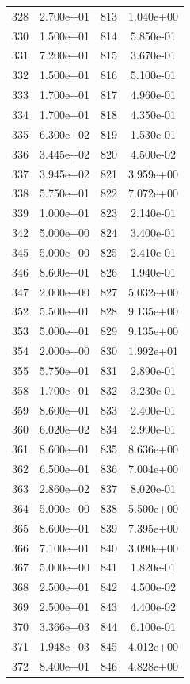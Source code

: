 \documentclass[12pt]{article}
\begin{document}
\begin{longtable}{@{}cccc@{}}
328 & 2.700e+01 & 813 & 1.040e+00 \\
330 & 1.500e+01 & 814 & 5.850e-01 \\
331 & 7.200e+01 & 815 & 3.670e-01 \\
332 & 1.500e+01 & 816 & 5.100e-01 \\
333 & 1.700e+01 & 817 & 4.960e-01 \\
334 & 1.700e+01 & 818 & 4.350e-01 \\
335 & 6.300e+02 & 819 & 1.530e-01 \\
336 & 3.445e+02 & 820 & 4.500e-02 \\
337 & 3.945e+02 & 821 & 3.959e+00 \\
338 & 5.750e+01 & 822 & 7.072e+00 \\
339 & 1.000e+01 & 823 & 2.140e-01 \\
342 & 5.000e+00 & 824 & 3.400e-01 \\
345 & 5.000e+00 & 825 & 2.410e-01 \\
346 & 8.600e+01 & 826 & 1.940e-01 \\
347 & 2.000e+00 & 827 & 5.032e+00 \\
352 & 5.500e+01 & 828 & 9.135e+00 \\
353 & 5.000e+01 & 829 & 9.135e+00 \\
354 & 2.000e+00 & 830 & 1.992e+01 \\
355 & 5.750e+01 & 831 & 2.890e-01 \\
358 & 1.700e+01 & 832 & 3.230e-01 \\
359 & 8.600e+01 & 833 & 2.400e-01 \\
360 & 6.020e+02 & 834 & 2.990e-01 \\
361 & 8.600e+01 & 835 & 8.636e+00 \\
362 & 6.500e+01 & 836 & 7.004e+00 \\
363 & 2.860e+02 & 837 & 8.020e-01 \\
364 & 5.000e+00 & 838 & 5.500e+00 \\
365 & 8.600e+01 & 839 & 7.395e+00 \\
366 & 7.100e+01 & 840 & 3.090e+00 \\
367 & 5.000e+00 & 841 & 1.820e-01 \\
368 & 2.500e+01 & 842 & 4.500e-02 \\
369 & 2.500e+01 & 843 & 4.400e-02 \\
370 & 3.366e+03 & 844 & 6.100e-01 \\
371 & 1.948e+03 & 845 & 4.012e+00 \\
372 & 8.400e+01 & 846 & 4.828e+00 \\

\end{longtable}
\end{document}
